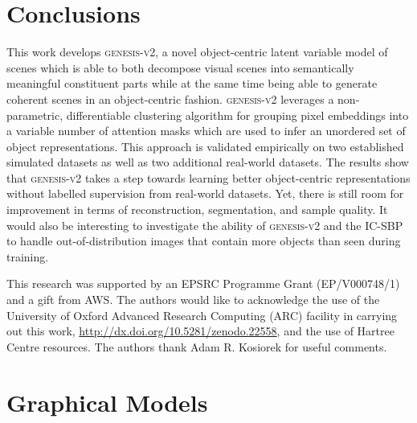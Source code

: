 \documentclass{article}
\begin{document}
\section{Conclusions}

This work develops \textsc{genesis-v2}, a novel object-centric latent variable model of scenes which is able to both decompose visual scenes into semantically meaningful constituent parts while at the same time being able to generate coherent scenes in an object-centric fashion.
\textsc{genesis-v2} leverages a non-parametric, differentiable clustering algorithm for grouping pixel embeddings into a variable number of attention masks which are used to infer an unordered set of object representations.
This approach is validated empirically on two established simulated datasets as well as two additional real-world datasets.
The results show that \textsc{genesis-v2} takes a step towards learning better object-centric representations without labelled supervision from real-world datasets.
Yet, there is still room for improvement in terms of reconstruction, segmentation, and sample quality.
It would also be interesting to investigate the ability of \textsc{genesis-v2} and the IC-SBP to handle out-of-distribution images that contain more objects than seen during training.

\clearpage


\begin{ack}


This research was supported by an EPSRC Programme Grant (EP/V000748/1) and a gift from AWS. The authors would like to acknowledge the use of the University of Oxford Advanced Research Computing (ARC) facility in carrying out this work, \url{http://dx.doi.org/10.5281/zenodo.22558}, and the use of Hartree Centre resources. The authors thank Adam R. Kosiorek for useful comments.
\end{ack}


{\small

}













\clearpage

\appendix

\section{Graphical Models}
\label{app:pgm}
\end{document}
